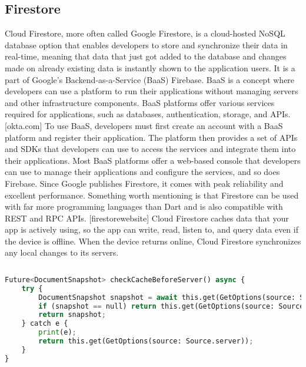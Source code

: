 \subsection{Firestore}
Cloud Firestore, more often called Google Firestore, is a cloud-hosted NoSQL database option that enables developers to store and synchronize their data in real-time, meaning that data that just got added to the database and changes made on already existing data is instantly shown to the application users. It is a part of Google's Backend-as-a-Service (BaaS) Firebase. BaaS is a concept where developers can use a platform to run their applications without managing servers and other infrastructure components. BaaS platforms offer various services required for applications, such as databases, authentication, storage, and APIs. [okta.com] To use BaaS, developers must first create an account with a BaaS platform and register their application. The platform then provides a set of APIs and SDKs that developers can use to access the services and integrate them into their applications. Most BaaS platforms offer a web-based console that developers can use to manage their applications and configure the services, and so does Firebase. Since Google publishes Firestore, it comes with peak reliability and excellent performance. Something worth mentioning is that Firestore can be used with far more programming languages than Dart and is also compatible with REST and RPC APIs. [firestorewebsite] Cloud Firestore caches data that your app is actively using, so the app can write, read, listen to, and query data even if the device is offline. When the device returns online, Cloud Firestore synchronizes any local changes to its servers.
\begin{lstlisting}[language=Python, caption={Dart - Firestore-Query}]
	
Future<DocumentSnapshot> checkCacheBeforeServer() async {
	try {
		DocumentSnapshot snapshot = await this.get(GetOptions(source: Source.cache));
		if (snapshot == null) return this.get(GetOptions(source: Source.server));
		return snapshot;
	} catch e {
		print(e);
		return this.get(GetOptions(source: Source.server));
	}
}
	
\end{lstlisting}
\noindent

